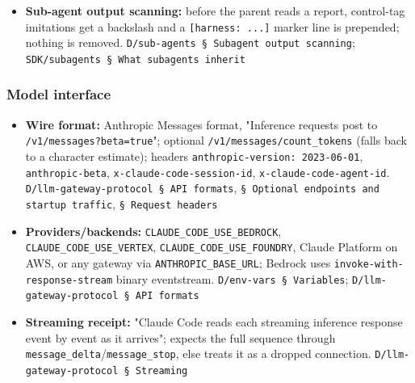 \begin{itemize}
\item \textbf{Sub-agent output scanning:} before the parent reads a report, control-tag imitations get a backslash and a \texttt{[harness:\allowbreak{} .\allowbreak{}.\allowbreak{}.\allowbreak{}]} marker line is prepended; nothing is removed. \texttt{D/\allowbreak{}sub-\allowbreak{}agents § Subagent output scanning}; \texttt{SDK/\allowbreak{}subagents § What subagents inherit}
\end{itemize}

\subsubsection*{Model interface}
\begin{itemize}
\item \textbf{Wire format:} Anthropic Messages format, "Inference requests post to \texttt{/\allowbreak{}v1/\allowbreak{}messages?beta=true}"; optional \texttt{/\allowbreak{}v1/\allowbreak{}messages/\allowbreak{}count\_\allowbreak{}tokens} (falls back to a character estimate); headers \texttt{anthropic-\allowbreak{}version:\allowbreak{} 2023-\allowbreak{}06-\allowbreak{}01}, \texttt{anthropic-\allowbreak{}beta}, \texttt{x-\allowbreak{}claude-\allowbreak{}code-\allowbreak{}session-\allowbreak{}id}, \texttt{x-\allowbreak{}claude-\allowbreak{}code-\allowbreak{}agent-\allowbreak{}id}. \texttt{D/\allowbreak{}llm-\allowbreak{}gateway-\allowbreak{}protocol § API formats}, \texttt{§ Optional endpoints and startup traffic}, \texttt{§ Request headers}
\item \textbf{Providers/backends:} \texttt{CLAUDE\_\allowbreak{}CODE\_\allowbreak{}USE\_\allowbreak{}BEDROCK}, \texttt{CLAUDE\_\allowbreak{}CODE\_\allowbreak{}USE\_\allowbreak{}VERTEX}, \texttt{CLAUDE\_\allowbreak{}CODE\_\allowbreak{}USE\_\allowbreak{}FOUNDRY}, Claude Platform on AWS, or any gateway via \texttt{ANTHROPIC\_\allowbreak{}BASE\_\allowbreak{}URL}; Bedrock uses \texttt{invoke-\allowbreak{}with-\allowbreak{}response-\allowbreak{}stream} binary eventstream. \texttt{D/\allowbreak{}env-\allowbreak{}vars § Variables}; \texttt{D/\allowbreak{}llm-\allowbreak{}gateway-\allowbreak{}protocol § API formats}
\item \textbf{Streaming receipt:} "Claude Code reads each streaming inference response event by event as it arrives"; expects the full sequence through \texttt{message\_\allowbreak{}delta}/\texttt{message\_\allowbreak{}stop}, else treats it as a dropped connection. \texttt{D/\allowbreak{}llm-\allowbreak{}gateway-\allowbreak{}protocol § Streaming}

\end{itemize}
